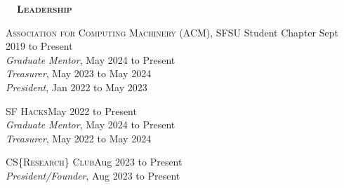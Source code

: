 \documentclass[hidelinks, 10.5pt]{article}
\def\contentwidth{0.9\linewidth}    %
\def\contentblockspacing{2.5mm}     %
\def\sectionspacing{8mm}            %
\def\sectiontocontentspacing{4mm}   %
\renewcommand{\section}[1]{
    {\fontsize{14}{14}\selectfont \textsc{\textbf{\ \ #1\ \ }}}\hrulefill
}
\begin{document}
{%






\section{Leadership}

\vspace{\sectiontocontentspacing}

\begin{minipage}[ct]{\contentwidth}
    \textsc{Association for Computing Machinery} (ACM), SFSU Student Chapter\hfill
    Sept 2019 to Present\\
    \emph{Graduate Mentor}, May 2024 to Present\\
    \emph{Treasurer}, May 2023 to May 2024\\
    \emph{President}, Jan 2022 to May 2023
\end{minipage}

\vspace{\contentblockspacing}

\begin{minipage}[ct]{\contentwidth}
    \textsc{SF Hacks}\hfill May 2022 to Present\\
    \emph{Graduate Mentor}, May 2024 to Present\\
    \emph{Treasurer}, May 2022 to May 2024
\end{minipage}

\vspace{\contentblockspacing}

\begin{minipage}[ct]{\contentwidth}
    \textsc{CS}\{\textsc{Research}\}\textsc{ Club}\hfill Aug 2023 to Present\\
    \emph{President/Founder}, Aug 2023 to Present
\end{minipage}

}
\end{document}
